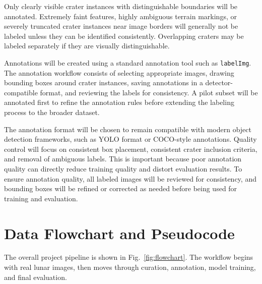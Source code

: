 \documentclass[conference]{IEEEtran}
\begin{document}
	Only clearly visible crater instances with distinguishable boundaries will be annotated. Extremely faint features, highly ambiguous terrain markings, or severely truncated crater instances near image borders will generally not be labeled unless they can be identified consistently. Overlapping craters may be labeled separately if they are visually distinguishable.
	
	Annotations will be created using a standard annotation tool such as \texttt{labelImg}. The annotation workflow consists of selecting appropriate images, drawing bounding boxes around crater instances, saving annotations in a detector-compatible format, and reviewing the labels for consistency. A pilot subset will be annotated first to refine the annotation rules before extending the labeling process to the broader dataset.
	
	The annotation format will be chosen to remain compatible with modern object detection frameworks, such as YOLO format or COCO-style annotations. Quality control will focus on consistent box placement, consistent crater inclusion criteria, and removal of ambiguous labels. This is important because poor annotation quality can directly reduce training quality and distort evaluation results. To ensure annotation quality, all labeled images will be reviewed for consistency, and bounding boxes will be refined or corrected as needed before being used for training and evaluation.
	
	\section{Data Flowchart and Pseudocode}
	The overall project pipeline is shown in Fig.~\ref{fig:flowchart}. The workflow begins with real lunar images, then moves through curation, annotation, model training, and final evaluation.
	
\end{document}
